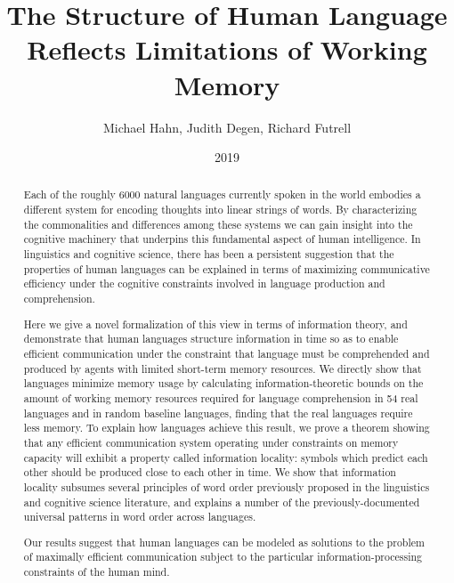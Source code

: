 \documentclass[12pt]{article}
\title{The Structure of Human Language Reflects Limitations of Working Memory}
\author{Michael Hahn, Judith Degen, Richard Futrell}
\date{2019}
\date{}
\newcounter{theorem}
\begin{document}


\maketitle

\begin{abstract}
  Each of the roughly 6000 natural languages currently spoken in the world embodies a different system for encoding thoughts into linear strings of words.
  By characterizing the commonalities and differences among these systems we can gain insight into the cognitive machinery that underpins this fundamental aspect of human intelligence. 
  In linguistics and cognitive science, there has been a persistent suggestion that the properties of human languages can be explained in terms of maximizing communicative efficiency under the cognitive constraints involved in language production and comprehension.

  Here we give a novel formalization of this view in terms of information theory, and demonstrate that human languages structure information in time so as to enable efficient communication under the constraint that language must be comprehended and produced by agents with limited short-term memory resources.
  We directly show that languages minimize memory usage by calculating information-theoretic bounds on the amount of working memory resources required for language comprehension in 54 real languages and in random baseline languages, finding that the real languages require less memory.
  To explain how languages achieve this result, we prove a theorem showing that any efficient communication system operating under constraints on memory capacity will exhibit a property called information locality: symbols which predict each other should be produced close to each other in time.
  We show that information locality subsumes several principles of word order previously proposed in the linguistics and cognitive science literature, and explains a number of the previously-documented universal patterns in word order across languages.
  
  Our results suggest that human languages can be modeled as solutions to the problem of maximally efficient communication subject to the particular information-processing constraints of the human mind. 
\end{abstract}
\end{document}
